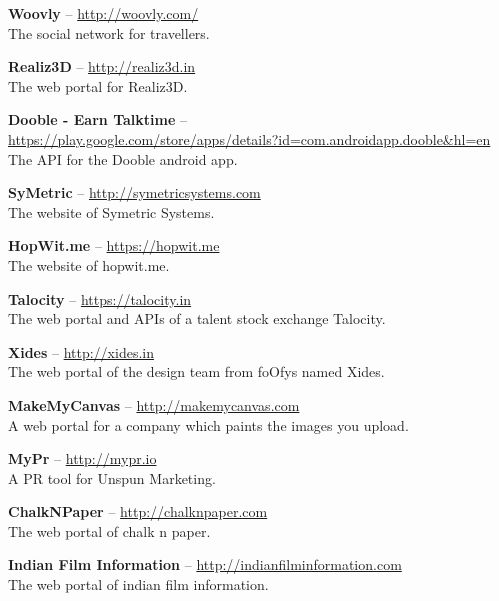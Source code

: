 \documentclass[11pt,a4paper]{moderncv}
\begin{document}
\cvlistitem
{\textbf{Woovly} -- {\small \href{http://woovly.com/}{http://woovly.com/}}  
  \\The social network for travellers.
}

\cvlistitem
{\textbf{Realiz3D} -- {\small \href{http://realiz3d.in}{http://realiz3d.in}}  
  \\The web portal for Realiz3D.
}

\cvlistitem
{\textbf{Dooble - Earn Talktime} -- \\ {\small \href{https://play.google.com/store/apps/details?id=com.androidapp.dooble\&hl=en}{https://play.google.com/store/apps/details?id=com.androidapp.dooble\&hl=en}}  
  \\The API for the Dooble android app.
}

\cvlistitem
{\textbf{SyMetric} -- {\small \href{http://symetricsystems.com}{http://symetricsystems.com}}  
  \\The website of Symetric Systems.
}

\cvlistitem
{\textbf{HopWit.me} -- {\small \href{https://hopwit.me}{https://hopwit.me}}  
  \\The website of hopwit.me.
}

\cvlistitem
{\textbf{Talocity} -- {\small \href{https://talocity.in}{https://talocity.in}}  
  \\The web portal and APIs of a talent stock exchange Talocity.
}

\cvlistitem
{\textbf{Xides} -- {\small \href{http://xides.in}{http://xides.in}}
  \\The web portal of the design team from foOfys named Xides.
}

\cvlistitem
{\textbf{MakeMyCanvas} -- {\small \href{http://makemycanvas.com}{http://makemycanvas.com}}
  \\A web portal for a company which paints the images you upload.
}

\cvlistitem
{\textbf{MyPr} -- {\small \href{http://mypr.io}{http://mypr.io}}
  \\A PR tool for Unspun Marketing.
}

\cvlistitem
{\textbf{ChalkNPaper} -- {\small \href{http://chalknpaper.com}{http://chalknpaper.com}}
  \\The web portal of chalk n paper.
}

\cvlistitem
{\textbf{Indian Film Information} -- {\small \href{http://indianfilminformation.com}{http://indianfilminformation.com}}
  \\The web portal of indian film information.
}
\end{document}
